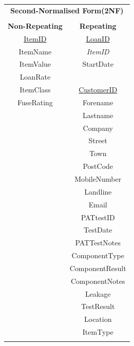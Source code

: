 \newpage

\begin{center}
    \begin{tabular}{|c|c|}
        \hline
        \multicolumn{2}{|c|}{\textbf{Second-Normalised Form(2NF)}} \\
        \multicolumn{2}{|c|}{ }                                    \\ \hline
        \textbf{Non-Repeating} & \textbf{Repeating}                \\ \hline
        \underline{ItemID}     & \underline{LoanID}                \\ 
        ItemName               & \emph{ItemID}                     \\ 
        ItemValue	          & StartDate                         \\ 
        LoanRate 	          &                                   \\
        ItemClass              & \underline{CustomerID}            \\ 
        FuseRating             & Forename                          \\ 
                               & Lastname                          \\ 
              	              & Company                           \\ 
                               & Street                            \\ 
                               & Town                              \\ 
                               & PostCode                          \\ 
                               & MobileNumber                      \\ 
                               & Landline                          \\ 
                               & Email                             \\ 
                               & PATtestID                         \\ 
                               & TestDate                          \\ 
                               & PATTestNotes                      \\ 
                               & ComponentType                     \\
                               & ComponentResult                   \\
                               & ComponentNotes                    \\
                               & Leakage                           \\ 
                               & TestResult                        \\ 
                               & Location                          \\
                               & ItemType                          \\ \hline
                               & 
    \end{tabular}
\end{center}

